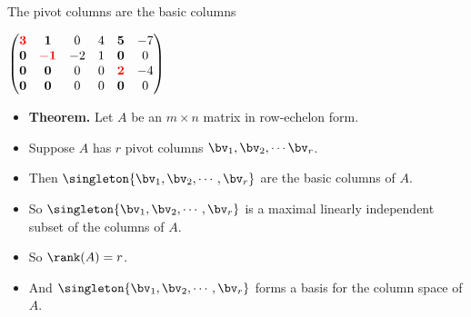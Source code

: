 \documentclass{beamer}
\begin{document}
\begin{frame}{The pivot columns are the basic columns}

$
\begin{pmatrix}
\textcolor{red}{\mathbf{3}} & \mathbf{1}                   &  0  & 4 & \mathbf{5}                  & -7 \\
\mathbf{0}                  & \textcolor{red}{\mathbf{-1}} & -2  & 1 & \mathbf{0}                  & 0  \\
\mathbf{0}                  & \mathbf{0}                   &  0  & 0 & \textcolor{red}{\mathbf{2}} & -4 \\
\mathbf{0}                  & \mathbf{0}                   &  0  & 0 & \mathbf{0}                  & 0  \\
\end{pmatrix}
$
\begin{itemize}
\item \textbf{Theorem.} Let $A$ be an $m\times n$ matrix in row-echelon form.
\item Suppose $A$ has $r$ pivot columns $\bv_1,\bv_2,\cdots\bv_r$.
\item Then $\singleton{\bv_1,\bv_2,\cdots,\bv_r}$ are the basic columns of $A$.
\item So $\singleton{\bv_1,\bv_2,\cdots,\bv_r}$ is a maximal linearly independent subset of the columns of $A$.
\item So $\rank(A)=r$.
\item And $\singleton{\bv_1,\bv_2,\cdots,\bv_r}$ forms a basis for the column space of $A$.
\end{itemize}

\end{frame}

\end{document}
